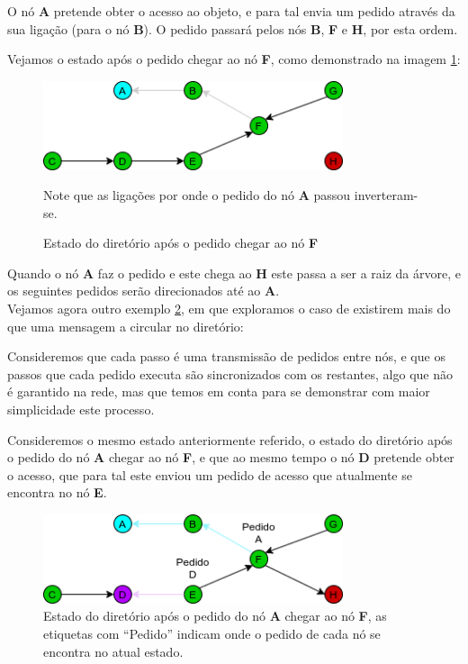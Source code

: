 O nó \textbf{A} pretende obter o acesso ao objeto, e para tal envia um pedido através da sua ligação (para o nó \textbf{B}).
O pedido passará pelos nós \textbf{B}, \textbf{F} e \textbf{H}, por esta ordem.

Vejamos o estado após o pedido chegar ao nó \textbf{F}, como demonstrado na imagem \ref{motivacao:img:apos_chegar_f}:

\begin{figure}[!htb]
\centering
\includegraphics[width=250pt]{um_pedido_2.png}
\caption{Estado do diretório após o pedido chegar ao nó \textbf{F}}
Note que as ligações por onde o pedido do nó \textbf{A} passou inverteram-se.
\label{motivacao:img:apos_chegar_f}
\end{figure}


Quando o nó \textbf{A} faz o pedido e este chega ao \textbf{H} este passa a ser a raiz da árvore,
e os seguintes pedidos serão direcionados até ao \textbf{A}.\\



Vejamos agora outro exemplo \ref{motivacao:img:apos_chegar_f_etiquetas},
em que exploramos o caso de existirem mais do que uma mensagem a circular no diretório:

Consideremos que cada passo é uma transmissão de pedidos entre nós, e que os passos que cada pedido executa são sincronizados com os restantes,
algo que não é garantido na rede, mas que temos em conta para se demonstrar com maior simplicidade este processo.

Consideremos o mesmo estado anteriormente referido,
o estado do diretório após o pedido do nó \textbf{A} chegar ao nó \textbf{F}, 
e que ao mesmo tempo o nó \textbf{D} pretende obter o acesso,
que para tal este enviou um pedido de acesso que atualmente se encontra no nó \textbf{E}.


\begin{figure}[!htb]
\centering
\includegraphics[width=250pt]{dois_pedidos_1.png}
\caption{Estado do diretório após o pedido do nó \textbf{A} chegar ao nó \textbf{F}, as etiquetas com ``Pedido'' indicam onde o pedido de cada nó se encontra no atual estado.}
\label{motivacao:img:apos_chegar_f_etiquetas}
\end{figure}

